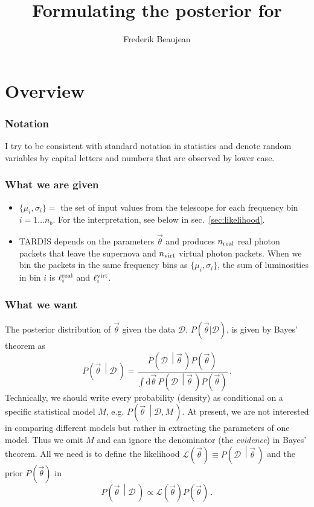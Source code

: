 \documentclass[a4,12pt]{article}
\title{Formulating the posterior for \tardis}
\author{Frederik Beaujean}
\newcommand{\data}{\ensuremath{\mathcal{D}}}
\newcommand{\expin}{\ensuremath{\lbrace\mu_i, \sigma_i\rbrace}}
\newcommand{\given}[2]{\left(#1\, \middle| #2 \, \right)}
\newcommand{\likelihood}{\ensuremath{\mathcal{L}}}
\newcommand{\lumi}{\ensuremath{\ell_i}}
\newcommand{\real}{\ensuremath{{\rm real}}}
\newcommand{\virt}{\ensuremath{{\rm virt}}}
\newcommand{\rmdx}[1]{\mbox{d} #1 \,} %
\newcommand{\vecth}{\ensuremath{{\vec{\theta}}}}
\def \refsec#1{sec.~\ref{sec:#1}}
\newcommand{\tardis}{TARDIS}
\begin{document}
\maketitle

\section{Overview}

\subsubsection*{Notation}
I try to be consistent with standard notation in statistics and
denote random variables by capital letters and numbers that are
observed by lower case.

\subsubsection*{What we are given}
\begin{itemize}
  \item $\expin =$ the set of input values from the telescope for each
  frequency bin $i=1 \dots n_b$. For the interpretation, see below in
  \refsec{likelihood}.
\item \tardis{} depends on the parameters $\vecth$ and
  produces $n_\real$ real photon packets that leave the supernova and
  $n_\virt$ virtual photon packets. When we bin the packets in the same
  frequency bins as \expin, the sum of luminosities in bin $i$ is
  $\lumi^\real$ and $\lumi^\virt$.
\end{itemize}

\subsubsection*{What we want}
The posterior distribution of $\vecth$ given the data $\data$,
$P(\vecth | \data)$, is given by  Bayes' theorem as
\begin{equation}
  \label{eq:Bayes-full}
  P\given{\vecth}{\data} = \frac{P\given{\data}{\vecth} P(\vecth)}{\int \rmdx{\vecth} P\given{\data}{\vecth} P(\vecth)} \,.
\end{equation}
Technically, we should write every probability (density) as
conditional on a specific statistical model $M$,
e.g. $P\given{\vecth}{\data, M}$.  At present, we are not interested
in comparing different models but rather in extracting the parameters
of one model. Thus we omit $M$ and can ignore the denominator (the
\emph{evidence}) in Bayes' theorem. All we need is to define the
likelihood $\likelihood(\vecth) \equiv P\given{\data}{\vecth}$ and the
prior $P(\vecth)$ in
\begin{equation}
  \label{eq:Bayes-simple}
  P\given{\vecth}{\data} \propto \likelihood(\vecth) P(\vecth) \,.
\end{equation}
\end{document}
